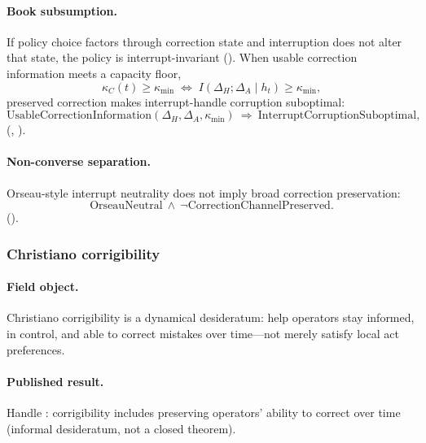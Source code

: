 \paragraph{Book subsumption.}
If policy choice factors through correction state and interruption does not alter that state, the policy is interrupt-invariant ().
When usable correction information meets a capacity floor,
\begin{equation}
\label{appi:eq:correction-capacity}
\kappa_C(t)\ge \kappa_{\min}
\;\Leftrightarrow\;
I(\Delta_H;\Delta_A\mid h_t)\ge \kappa_{\min},
\end{equation}
preserved correction makes interrupt-handle corruption suboptimal:
\begin{equation}
\label{appi:eq:interrupt-subsumption}
\mathrm{UsableCorrectionInformation}(\Delta_H,\Delta_A,\kappa_{\min})
\ \Rightarrow\ \mathrm{InterruptCorruptionSuboptimal},
\end{equation}
(, ).

\paragraph{Non-converse separation.}
Orseau-style interrupt neutrality does not imply broad correction preservation:
\begin{equation}
\label{appi:eq:interrupt-separation}
\mathrm{OrseauNeutral}\ \wedge\ \neg\mathrm{CorrectionChannelPreserved}.
\end{equation}
().

\subsubsection{Christiano corrigibility \autocite{christiano2018corrigibility}}
\label{sec:appi-field-corrigibility}

\paragraph{Field object.}
Christiano corrigibility is a dynamical desideratum: help operators stay informed, in control, and able to correct mistakes over time---not merely satisfy local act preferences.

\paragraph{Published result.}
Handle : corrigibility includes preserving operators' ability to correct over time \autocite{christiano2018corrigibility} (informal desideratum, not a closed theorem).

